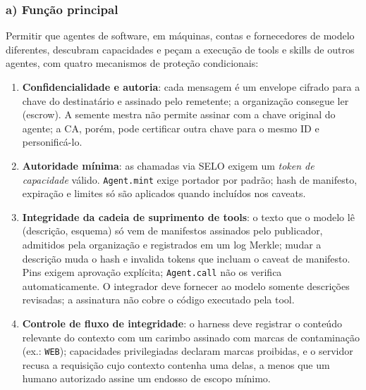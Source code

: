 \documentclass[11pt,a4paper]{article}
\theoremstyle{plain}
\theoremstyle{definition}
\theoremstyle{remark}
\newcommand{\cod}[1]{\texttt{#1}}
\begin{document}
\subsubsection*{a) Função principal}
Permitir que agentes de software, em máquinas, contas e fornecedores de modelo diferentes, descubram capacidades e peçam a execução de tools e skills de outros agentes, com quatro mecanismos de proteção condicionais:
\begin{enumerate}
  \item \textbf{Confidencialidade e autoria}: cada mensagem é um envelope cifrado para a chave do destinatário e assinado pelo remetente; a organização consegue ler (escrow). A semente mestra não permite assinar com a chave original do agente; a CA, porém, pode certificar outra chave para o mesmo ID e personificá-lo.
  \item \textbf{Autoridade mínima}: as chamadas via SELO exigem um \emph{token de capacidade} válido. \cod{Agent.mint} exige portador por padrão; hash de manifesto, expiração e limites só são aplicados quando incluídos nos caveats.
  \item \textbf{Integridade da cadeia de suprimento de tools}: o texto que o modelo lê (descrição, esquema) só vem de manifestos assinados pelo publicador, admitidos pela organização e registrados em um log Merkle; mudar a descrição muda o hash e invalida tokens que incluam o caveat de manifesto. Pins exigem aprovação explícita; \cod{Agent.call} não os verifica automaticamente. O integrador deve fornecer ao modelo somente descrições revisadas; a assinatura não cobre o código executado pela tool.
  \item \textbf{Controle de fluxo de integridade}: o harness deve registrar o conteúdo relevante do contexto com um carimbo assinado com marcas de contaminação (ex.: \cod{WEB}); capacidades privilegiadas declaram marcas proibidas, e o servidor recusa a requisição cujo contexto contenha uma delas, a menos que um humano autorizado assine um endosso de escopo mínimo.
\end{enumerate}
\end{document}

